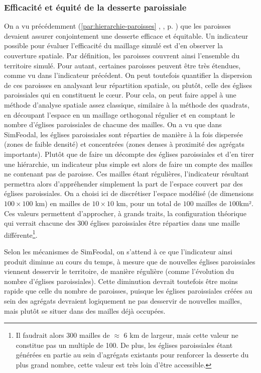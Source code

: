 \clearpage

\subsubsection{Efficacité et équité de la desserte paroissiale}

On a vu précédemment (\ref{par:hierarchie-paroisses} , , p. \pageref{par:hierarchie-paroisses}) que les paroisses devaient assurer conjointement une desserte efficace et équitable.
Un indicateur possible pour évaluer l'efficacité du maillage simulé est d'en observer la couverture spatiale.
Par définition, les paroisses couvrent ainsi l'ensemble du territoire simulé. 
Pour autant, certaines paroisses peuvent être très étendues, comme vu dans l'indicateur précédent.
On peut toutefois quantifier la dispersion de ces paroisses en analysant leur répartition spatiale, ou plutôt, celle des églises paroissiales qui en constituent le cœur.
Pour cela, on peut faire appel à une méthode d'analyse spatiale assez classique, similaire à la méthode des quadrats, en découpant l'espace en un maillage orthogonal régulier et en comptant le nombre d'églises paroissiales de chacune des mailles.
On a vu que dans SimFeodal, les églises paroissiales sont réparties de manière à la fois dispersée (zones de faible densité) et concentrées (zones denses à proximité des agrégats importants).
Plutôt que de faire un décompte des églises paroissiales et d'en tirer une hiérarchie, un indicateur plus simple est alors de faire un compte des mailles ne contenant pas de paroisse. Ces mailles étant régulières, l'indicateur résultant permettra alors d'appréhender simplement la part de l'espace couvert par des églises paroissiales.
On a choisi ici de discrétiser l'espace modélisé (de dimensions $100\times100$ km) en mailles de $10\times10$ km, pour un total de $100$ mailles de $100$km².
Ces valeurs permettent d'approcher, à grands traits, la configuration théorique qui verrait chacune des 300 églises paroissiales être réparties dans une maille différente\footnote{Il faudrait alors 300 mailles de $\approx$ 6 km de largeur, mais cette valeur ne constitue pas un multiple de 100. De plus, les églises paroissiales étant générées en partie au sein d'agrégats existants pour renforcer la desserte du plus grand nombre, cette valeur est très loin d'être accessible.}.

Selon les mécanismes de SimFeodal, on s'attend à ce que l'indicateur ainsi produit diminue au cours du temps, à mesure que de nouvelles églises paroissiales viennent desservir le territoire, de manière régulière (comme l'évolution du nombre d'églises paroissiales).
Cette diminution devrait toutefois être moins rapide que celle du nombre de paroisses, puisque les églises paroissiales créées au sein des agrégats devraient logiquement ne pas desservir de nouvelles mailles, mais plutôt se situer dans des mailles déjà occupées.

